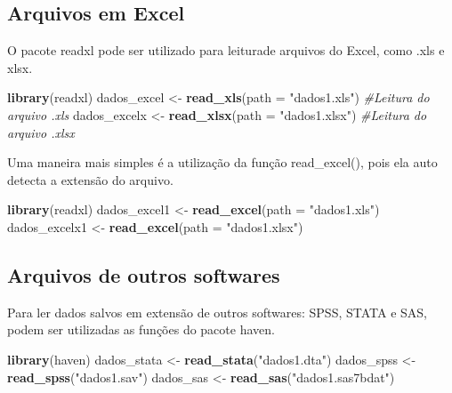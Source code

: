 \documentclass[
]{book}
\newenvironment{Shaded}{\begin{snugshade}}{\end{snugshade}}
\newcommand{\CommentTok}[1]{\textcolor[rgb]{0.56,0.35,0.01}{\textit{#1}}}
\newcommand{\DataTypeTok}[1]{\textcolor[rgb]{0.13,0.29,0.53}{#1}}
\newcommand{\KeywordTok}[1]{\textcolor[rgb]{0.13,0.29,0.53}{\textbf{#1}}}
\newcommand{\NormalTok}[1]{#1}
\newcommand{\StringTok}[1]{\textcolor[rgb]{0.31,0.60,0.02}{#1}}
\begin{document}
\hypertarget{arquivos-em-excel}{%
\subsection{Arquivos em Excel}\label{arquivos-em-excel}}

O pacote readxl pode ser utilizado para leiturade arquivos do Excel, como .xls e xlsx.

\begin{Shaded}
\begin{Highlighting}[]
\KeywordTok{library}\NormalTok{(readxl)}
\NormalTok{dados_excel <-}\StringTok{ }\KeywordTok{read_xls}\NormalTok{(}\DataTypeTok{path =} \StringTok{"dados1.xls"}\NormalTok{) }\CommentTok{#Leitura do arquivo .xls}
\NormalTok{dados_excelx <-}\StringTok{ }\KeywordTok{read_xlsx}\NormalTok{(}\DataTypeTok{path =} \StringTok{"dados1.xlsx"}\NormalTok{) }\CommentTok{#Leitura do arquivo .xlsx}
\end{Highlighting}
\end{Shaded}

Uma maneira mais simples é a utilização da função read\_excel(), pois ela auto detecta a extensão do arquivo.

\begin{Shaded}
\begin{Highlighting}[]
\KeywordTok{library}\NormalTok{(readxl)}
\NormalTok{dados_excel1 <-}\StringTok{ }\KeywordTok{read_excel}\NormalTok{(}\DataTypeTok{path =} \StringTok{"dados1.xls"}\NormalTok{)}
\NormalTok{dados_excelx1 <-}\StringTok{ }\KeywordTok{read_excel}\NormalTok{(}\DataTypeTok{path =} \StringTok{"dados1.xlsx"}\NormalTok{)}
\end{Highlighting}
\end{Shaded}

\hypertarget{arquivos-de-outros-softwares}{%
\subsection{Arquivos de outros softwares}\label{arquivos-de-outros-softwares}}

Para ler dados salvos em extensão de outros softwares: SPSS, STATA e SAS, podem ser utilizadas as funções do pacote haven.

\begin{Shaded}
\begin{Highlighting}[]
\KeywordTok{library}\NormalTok{(haven)}
\NormalTok{dados_stata <-}\StringTok{ }\KeywordTok{read_stata}\NormalTok{(}\StringTok{"dados1.dta"}\NormalTok{)}
\NormalTok{dados_spss <-}\StringTok{ }\KeywordTok{read_spss}\NormalTok{(}\StringTok{"dados1.sav"}\NormalTok{)}
\NormalTok{dados_sas <-}\StringTok{ }\KeywordTok{read_sas}\NormalTok{(}\StringTok{"dados1.sas7bdat"}\NormalTok{)  }
\end{Highlighting}
\end{Shaded}
\end{document}

